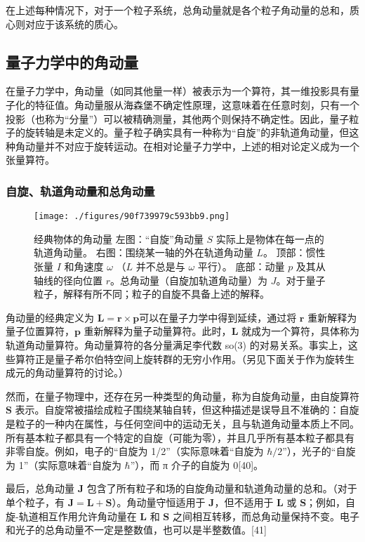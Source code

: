 在上述每种情况下，对于一个粒子系统，总角动量就是各个粒子角动量的总和，质心则对应于该系统的质心。
\subsection{量子力学中的角动量} 
在量子力学中，角动量（如同其他量一样）被表示为一个算符，其一维投影具有量子化的特征值。角动量服从海森堡不确定性原理，这意味着在任意时刻，只有一个投影（也称为“分量”）可以被精确测量，其他两个则保持不确定性。因此，量子粒子的旋转轴是未定义的。量子粒子确实具有一种称为“自旋”的非轨道角动量，但这种角动量并不对应于旋转运动。在相对论量子力学中，上述的相对论定义成为一个张量算符。
\subsubsection{自旋、轨道角动量和总角动量}  
\begin{figure}[ht]
\centering
\texttt{[image: ./figures/90f739979c593bb9.png]}
\caption{经典物体的角动量   左图：“自旋”角动量 \( S \) 实际上是物体在每一点的轨道角动量。   右图：围绕某一轴的外在轨道角动量 \( L \)。   顶部：惯性张量 \( I \) 和角速度 \( \omega \) （\( L \) 并不总是与 \( \omega \) 平行）。   底部：动量 \( p \) 及其从轴线的径向位置 \( r \)。总角动量（自旋加轨道角动量）为 \( J \)。对于量子粒子，解释有所不同；粒子的自旋不具备上述的解释。} \label{fig_JDL_12}
\end{figure}
角动量的经典定义为 \(\mathbf{L} = \mathbf{r} \times \mathbf{p}\)可以在量子力学中得到延续，通过将 \( \mathbf{r} \) 重新解释为量子位置算符，\( \mathbf{p} \) 重新解释为量子动量算符。此时，\( \mathbf{L} \) 就成为一个算符，具体称为轨道角动量算符。角动量算符的各分量满足李代数 so(3) 的对易关系。事实上，这些算符正是量子希尔伯特空间上旋转群的无穷小作用。（另见下面关于作为旋转生成元的角动量算符的讨论。）

然而，在量子物理中，还存在另一种类型的角动量，称为自旋角动量，由自旋算符 \( \mathbf{S} \) 表示。自旋常被描绘成粒子围绕某轴自转，但这种描述是误导且不准确的：自旋是粒子的一种内在属性，与任何空间中的运动无关，且与轨道角动量本质上不同。所有基本粒子都具有一个特定的自旋（可能为零），并且几乎所有基本粒子都具有非零自旋。例如，电子的“自旋为 1/2”（实际意味着“自旋为 \( \hbar / 2 \)”），光子的“自旋为 1”（实际意味着“自旋为 \( \hbar \)”），而 π 介子的自旋为 0[40]。

最后，总角动量 \( \mathbf{J} \) 包含了所有粒子和场的自旋角动量和轨道角动量的总和。（对于单个粒子，有 \( \mathbf{J} = \mathbf{L} + \mathbf{S} \)）。角动量守恒适用于 \( \mathbf{J} \)，但不适用于 \( \mathbf{L} \) 或 \( \mathbf{S} \)；例如，自旋-轨道相互作用允许角动量在 \( \mathbf{L} \) 和 \( \mathbf{S} \) 之间相互转移，而总角动量保持不变。电子和光子的总角动量不一定是整数值，也可以是半整数值。[41]

